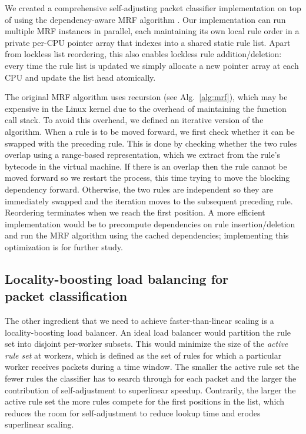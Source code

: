 We created a comprehensive self-adjusting packet classifier implementation on top of \nftables using the dependency-aware MRF algorithm \cite{10228937}. Our implementation can run multiple MRF instances in parallel, each maintaining its own local rule order in a private per-CPU pointer array that indexes into a shared static rule list. Apart from lockless list reordering, this also enables lockless rule addition\slash deletion: every time the rule list is updated we simply allocate a new pointer array at each CPU and update the list head atomically.

The original MRF algorithm uses recursion (see Alg.~\ref{alg:mrf}), which may be expensive in the Linux kernel due to the overhead of maintaining the function call stack. To avoid this overhead, we defined an iterative version of the algorithm. When a rule is to be moved forward, we first check whether it can be swapped with the preceding rule. This is done by checking whether the two rules overlap using a range-based representation, which we extract from the rule's bytecode in the \nftables virtual machine. If there is an overlap then the rule cannot be moved forward so we restart the process, this time trying to move the blocking dependency forward. Otherwise, the two rules are independent so they are immediately swapped and the iteration moves to the subsequent preceding rule. Reordering terminates when we reach the first position. A more efficient implementation would be to precompute dependencies on rule insertion\slash deletion and run the MRF algorithm using the cached dependencies; implementing this optimization is for further study. %

\subsection{Locality-boosting load balancing for\\ packet classification}
\label{sec:sa-rss}

The other ingredient that we need to achieve faster-than-linear scaling is a locality-boosting load balancer.  An ideal load balancer would partition the rule set into disjoint per-worker subsets. This would minimize the size of the \emph{active rule set} at workers, which is defined as the set of rules for which a particular worker receives packets during a time window. The smaller the active rule set the fewer rules the classifier has to search through for each packet and the larger the contribution of self-adjustment to superlinear speedup. Contrarily, the larger the active rule set the more rules compete for the first positions in the list, which reduces the room for self-adjustment to reduce lookup time and erodes superlinear scaling.

